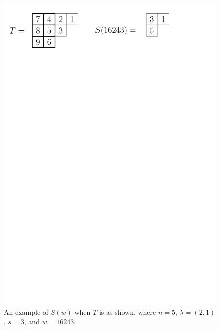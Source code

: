 \documentclass[12pt]{amsart}
\newcommand{\la}{\lambda}
\begin{document}
\begin{figure}
  \centering
  \includegraphics[scale=0.6]{Figures/SOfw.pdf}
  \caption{An example of $S(w)$ when $T$ is as shown, where $n=5$, $\la=(2,1)$, $s=3$, and $w=16243$.\label{fig:SOfw}} 
\end{figure}
\end{document}
